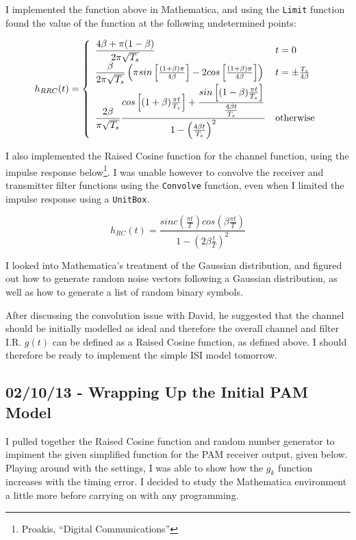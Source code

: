 I implemented the function above in Mathematica, and using the
\texttt{Limit} function found the value of the function at the following
undetermined points:

\[
h_{RRC}(t) = \left\{
  \begin{array}{l l}
    \dfrac{4 \beta + \pi (1 - \beta)}{2 \pi \sqrt{T_s}} & t = 0 \\
    \dfrac{\beta}{2 \pi \sqrt{T_s}} \left ( \pi sin \left [ \frac{(1 + \beta) \pi}{4 \beta} \right ] - 2 cos \left [ \frac{(1 + \beta) \pi}{4 \beta} \right ] \right ) & t = \pm \frac{T_s}{ 4 \beta } \\
    \dfrac{2 \beta}{\pi \sqrt{T_s}} \dfrac{cos \left [ (1 + \beta) \frac{\pi t}{T_s} \right ] + \dfrac{sin \left [ (1 - \beta) \frac{\pi t}{T_s} \right ]}{\frac{4 \beta t}{T_s}}}{1 - \left ( \frac{4 \beta t}{T_s} \right )^2} & \text{otherwise}
  \end{array}\right.
\]

I also implemented the Raised Cosine function for the channel function,
using the impulse response below\footnote{Proakis, ``Digital
  Communications''}. I was unable however to convolve the receiver and
transmitter filter functions using the \texttt{Convolve} function, even
when I limited the impulse response using a \texttt{UnitBox}.

\[
h_{RC}(t) = \frac{sinc \left ( \frac{\pi t}{T} \right ) cos \left ( \beta \frac{\pi t}{T} \right )}{1 - \left ( 2 \beta \frac{t}{T} \right )^2}
\]

I looked into Mathematica's treatment of the Gaussian distribution, and
figured out how to generate random noise vectors following a Gaussian
distribution, as well as how to generate a list of random binary
symbols.

After discussing the convolution issue with David, he suggested that the
channel should be initially modelled as ideal and therefore the overall
channel and filter I.R. $g(t)$ can be defined as a Raised Cosine
function, as defined above. I should therefore be ready to implement the
simple ISI model tomorrow.

\subsection{02/10/13 - Wrapping Up the Initial PAM Model}

I pulled together the Raised Cosine function and random number generator
to impiment the given simplified function for the PAM receiver output,
given below. Playing around with the settings, I was able to show how
the $g_k$ function increases with the timing error. I decided to study
the Mathematica environment a little more before carrying on with any
programming.

